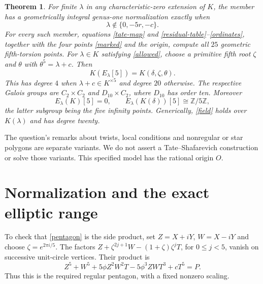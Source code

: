 \documentclass[11pt]{article}
\newtheorem{theorem}{Theorem}
\begin{document}
\begin{theorem}\label{main}
For finite $\lambda$ in any characteristic-zero extension of $K$, the
member has a geometrically integral genus-one normalization exactly when
\begin{equation}\label{allowed}
\lambda\notin\{0,-5r,-c\}.
\end{equation}
For every such member, equations \eqref{tate-map} and
\eqref{residual-table}--\eqref{ordinates}, together with the four points
\eqref{marked} and the origin, compute all $25$ geometric fifth-torsion
points. For $\lambda\in K$ satisfying \eqref{allowed}, choose a primitive
fifth root $\zeta$ and $\theta$ with $\theta^5=\lambda+c$. Then
\begin{equation}\label{field}
K(E_\lambda[5])=K(\delta,\zeta,\theta).
\end{equation}
This has degree $4$ when $\lambda+c\in K^{\times5}$ and degree $20$
otherwise. The respective Galois groups are $C_2\times C_2$ and
$D_{10}\times C_2$, where $D_{10}$ has order ten. Moreover
\begin{equation}\label{rational}
E_\lambda(K)[5]=0,\qquad
E_\lambda(K(\delta))[5]\cong\mathbb Z/5\mathbb Z,
\end{equation}
the latter subgroup being the five infinity points. Generically,
\eqref{field} holds over $K(\lambda)$ and has degree twenty.
\end{theorem}

The question's remarks about twists, local conditions and nonregular or
star polygons are separate variants. We do not assert a
Tate--Shafarevich construction or solve those variants. This specified
model has the rational origin $O$.

\section{Normalization and the exact elliptic range}
To check that \eqref{pentagon} is the side product, set $Z=X+iY$,
$W=X-iY$ and choose $\zeta=e^{2\pi i/5}$. The factors
$Z+\zeta^{2j+1}W-(1+\zeta)\zeta^jT$, for $0\le j<5$, vanish on
successive unit-circle vertices. Their product is
\[
Z^5+W^5+5\phi Z^2W^2T-5\phi^3ZWT^3+cT^5=P.
\]
Thus this is the required regular pentagon, with a fixed nonzero scaling.
\end{document}
